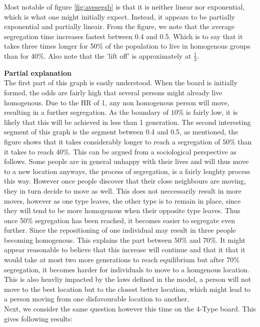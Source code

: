 Most notable of figure \ref{fig:avesegsb} is that it is neither linear nor exponential, which is what one might initially expect. Instead, it appears to be partially exponential and partially lineair. From the figure, we note that the average segregation time increases fastest between 0.4 and 0.5. 
Which is to say that it takes three times longer for 50\% of the population to live in homogenous groups than for 40\%.
Also note that the 'lift off' is approximately at $\frac{1}{3}$.

\textbf{Partial explanation} \\
The first part of this graph is easily understood. 
When the board is initially formed, the odds are fairly high that several persons might already live homogenous. Due to the HR of 1, any non homogenous person will move, resulting in a further segregation. As the boundary of \(10\%\) is fairly low, it is likely that this will be achieved in less than 1 generation. 
The second interesting segment of this graph is the segment between 0.4 and 0.5, as mentioned, the figure shows that it takes considerably longer to reach a segregation of \(50\%\) than it takes to reach \(40\%\). 
This can be argued from a sociological perspective as follows. Some people are in general unhappy with their lives and will thus move to a new location anyways, the process of segregation, is a fairly lenghty process this way. However once people discover that their close neighbours are moving, they in turn decide to move as well. 
This does not neccessarily result in more moves, however as one type leaves, the other type is to remain in place, since they will tend to be more homogenous when their opposite type leaves.
Thus once 50$\%$ segregation has been reached, it becomes easier to segregate even further. Since the repositioning of one individual may result in three people becoming homogenous. This explains the part between $50\%$ and $70\%$. It might appear reasonable to believe that this increase will continue and that it that it would take at most two more generations to reach equilibrium but after $70\%$ segregation, it becomes harder for individuals to move to a homgenous location.
 This is also heavliy impacted by the laws defined in the model, a person will not move to the best location but to the closest better location, which might lead to a person moving from one disfavourable location to another. \\

Next, we consider the same question however this time on the 4-Type board. This gives  following results:



